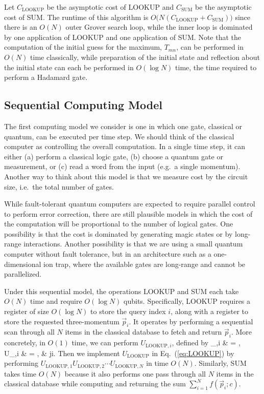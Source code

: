 \documentclass[aps,prd,twocolumn,superscriptaddress,preprintnumbers,nofootinbib,longbibliography,floatfix]{revtex4-1}
\DeclareRobustCommand{\Eq}[1]{Eq.~(\ref{#1})}
\def\begsub#1#2\endsub{\begin{subequations}\label{eq:#1}\begin{align}#2\end{align}\end{subequations}}
\begin{document}
Let $C_{\text{LOOKUP}}$ be the asymptotic cost of LOOKUP and $C_{\text{SUM}}$ be the asymptotic cost of SUM.
%
The runtime of this algorithm is $O\big(N (C_{\text{LOOKUP}}+C_{\text{SUM}}) \big)$ since there is an $O(N)$ outer Grover search loop, while the inner loop is dominated by one application of LOOKUP and one application of SUM.
%
Note that the computation of the initial guess for the maximum, $T_{mn}$, can be performed in $O(N)$ time classically, while preparation of the initial state and reflection about the initial state can each be performed in $O(\log N)$ time, the time required to perform a Hadamard gate.




\subsection{Sequential Computing Model}
\label{subsec:groverseq}

The first computing model we consider is one in which one gate, classical or quantum, can be executed per time step.
%
We should think of the classical computer as controlling the overall computation.
%
In a single time step, it can either (a) perform a classical logic gate, (b) choose a quantum gate or measurement, or (c) read a word from the input (e.g.\ a single momentum).
%
Another way to think about this model is that we measure cost by the circuit size, i.e.~the total number of gates. 

While fault-tolerant quantum computers are expected to require parallel control
to perform error correction, there are still plausible models in which the cost
of the computation will be proportional to the number of logical gates.  One
possibility is that the cost is dominated by generating magic states or by
long-range interactions.  Another possibility is that we are using a small
quantum computer without fault tolerance, but in an architecture such as a one-dimensional
ion trap, where the available gates are long-range and cannot be
parallelized.


Under this sequential model, the operations LOOKUP and SUM each take $O(N)$ time and require $O(\log N)$ qubits.
%
Specifically, LOOKUP requires a register of size $O(\log N)$ to store the query index $i$, along with a register to store the requested three-momentum $\vec{p}_i$.
%
It operates by performing a sequential scan through all $N$ items in the classical
database to fetch and return $\vec{p}_i$.
%
More concretely, in $O(1)$ time, we can perform $U_{\text{LOOKUP},i}$, defined by
\begsub{LOOKUPi}
U_{,i}  & = , \\
U_{,i}  & = , & j\neq i.
\endsub
%
Then we implement $U_{\text{LOOKUP}}$ in \Eq{eq:LOOKUP} by performing
$U_{\text{LOOKUP},1}U_{\text{LOOKUP},2}\cdots U_{\text{LOOKUP},N}$ in time $O(N)$.
%
Similarly, SUM takes time $O(N)$ because it also performs one pass through all $N$ items in the classical database while computing and returning the sum $\sum_{i=1}^N f(\vec{p}_i;c)$.
\end{document}
